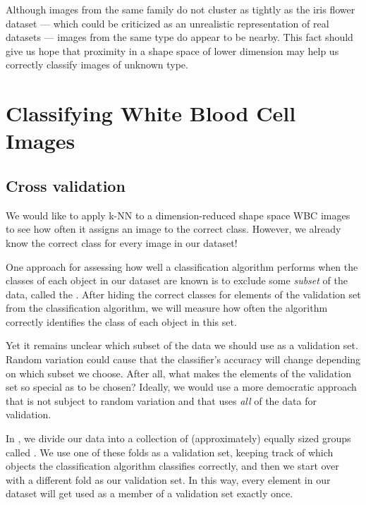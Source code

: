 Although images from the same family do not cluster as tightly as the iris flower dataset --- which could be criticized as an unrealistic representation of real datasets --- images from the same type do appear to be nearby. This fact should give us hope that proximity in a shape space of lower dimension may help us correctly classify images of unknown type.\\

\FloatBarrier
{}

\section{Classifying White Blood Cell Images}
\label{sec:training}

\subsection{Cross validation}

We would like to apply k-NN to a dimension-reduced shape space WBC images to see how often it assigns an image to the correct class. However, we already know the correct class for every image in our dataset! 

One approach for assessing how well a classification algorithm performs when the classes of each object in our dataset are known is to exclude some \textit{subset} of the data, called the . After hiding the correct classes for elements of the validation set from the classification algorithm, we will measure how often the algorithm correctly identifies the class of each object in this set.

Yet it remains unclear which subset of the data we should use as a validation set. Random variation could cause that the classifier's accuracy will change depending on which subset we choose. After all, what makes the elements of the validation set so special as to be chosen? Ideally, we would use a more democratic approach that is not subject to random variation and that uses \textit{all} of the data for validation.

In , we divide our data into a collection of  (approximately) equally sized groups called . We use one of these folds as a validation set, keeping track of which objects the classification algorithm classifies correctly, and then we start over with a different fold as our validation set. In this way, every element in our dataset will get used as a member of a validation set exactly once.

